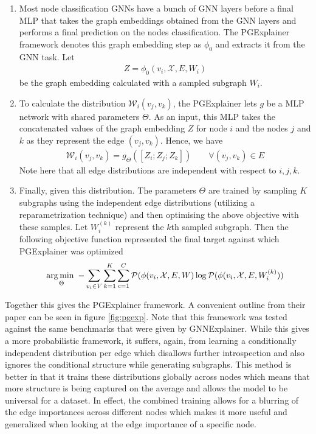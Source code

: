 \begin{enumerate}
	\item Most node classification GNNs have a bunch of GNN layers before a final MLP that takes the graph embeddings obtained from the GNN layers and performs a final prediction on the nodes classification. The PGExplainer framework denotes this graph embedding step as $\phi_0$ and extracts it from the GNN task. Let
	\begin{align*}
		Z = \phi_0(v_i, \mathcal{X}, E, W_i)
	\end{align*}
	be the graph embedding calculated with a sampled subgraph $W_i$.
	\item To calculate the distribution $\mathcal{W}_i(v_j, v_k)$, the PGExplainer lets $g$ be a MLP network with shared parameters $\Theta$. As an input, this MLP takes the concatenated values of the graph embedding $Z$ for node $i$ and the nodes $j$ and $k$ as they represent the edge $(v_j, v_k)$. Hence, we have
	\begin{align*}
		\mathcal{W}_i(v_j, v_k) = g_{\Theta}([Z_i; Z_j; Z_k]) \quad\quad \forall (v_j, v_k) \in E
	\end{align*}
	Note here that all edge distributions are independent with respect to $i, j, k$. 
	\item Finally, given this distribution. The parameters $\Theta$ are trained by sampling $K$ subgraphs using the independent edge distributions (utilizing a reparametrization technique) and then optimising the above objective with these samples. Let $W_i^{(k)}$ represent the $k$th sampled subgraph. Then the following objective function represented the final target against which PGExplainer was optimized
	\begin{align*}
		\operatorname*{arg\,min\,\,}_{\Theta} -\sum_{v_i \in V} \sum_{k = 1}^K \sum_{c = 1}^C \mathcal{P}(\phi(v_i, \mathcal{X}, E, W) \log \mathcal{P}(\phi(v_i, \mathcal{X}, E, W_i^{(k)}))
	\end{align*}
\end{enumerate}
Together this gives the PGExplainer framework. A convenient outline from their paper can be seen in figure \ref{fig:pgexp}. Note that this framework was tested against the same benchmarks that were given by GNNExplainer. While this gives a more probabilistic framework, it suffers, again, from learning a conditionally independent distribution per edge which disallows further introspection and also ignores the conditional structure while generating subgraphs. This method is better in that it trains these distributions globally across nodes which means that more structure is being captured on the average and allows the model to be universal for a dataset. In effect, the combined training allows for a blurring of the edge importances across different nodes which makes it more useful and generalized when looking at the edge importance of a specific node.

